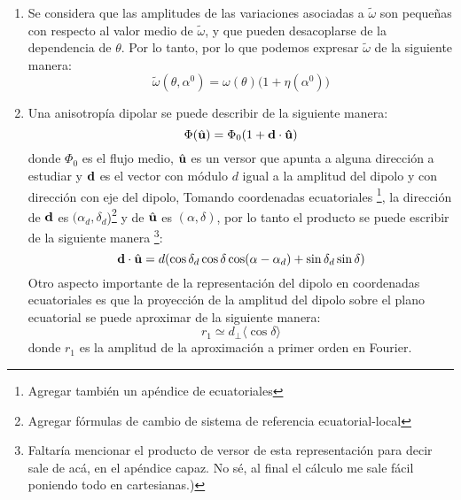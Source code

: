 \begin{enumerate}
    \item Se considera que las amplitudes de las variaciones asociadas a $\tilde{\omega}$ son pequeñas con respecto al valor medio de $\tilde{\omega}$, y que pueden  desacoplarse de la dependencia de $\theta$. Por lo tanto, por lo que podemos expresar $\tilde{\omega}$ de la siguiente manera:
    \begin{equation}
        \tilde{\omega}(\theta, \alpha^0) = \omega(\theta)\big(1 + \eta(\alpha^0) \big)
        \label{eq:omega_expandido}
    \end{equation}

    \item Una anisotropía dipolar se puede describir de la siguiente manera:
    \begin{equation}
        \Phi(\hat{\bf{u}}) = \Phi_0(1+\bf{d}\cdot\hat{\bf{u}})
        \label{eq:dipolo_general}
    \end{equation}
    \noindent donde $\Phi_0$ es el flujo medio, $\hat{\bf{u}}$ es un versor que apunta a alguna dirección a estudiar y $\bf{d}$ es el vector con módulo $d$ igual a la amplitud del dipolo y  con dirección  con eje del dipolo, Tomando coordenadas ecuatoriales \footnote{Agregar también un apéndice de ecuatoriales}, la dirección de $\bf{d}$ es $(\alpha_d, \delta_d$)\footnote{Agregar fórmulas de cambio de sistema de referencia ecuatorial-local} y  de $\hat{\bf{u}}$ es $(\alpha, \delta)$, por lo tanto  el producto se puede escribir de la siguiente manera \footnote{Faltaría mencionar el producto de versor de esta representación para decir sale de acá, en el apéndice capaz. No sé, al final el cálculo me  sale fácil poniendo  todo en cartesianas.)}:
    \begin{equation*}
        \textbf{d}\cdot\hat{\bf{u}}= d (\cos\delta_d \cos\delta \cos(\alpha - \alpha_d) + \sin\delta_d  \sin\delta)
        \label{eq:product_ud}
    \end{equation*}
    Otro aspecto importante de la representación del dipolo en coordenadas ecuatoriales es que la proyección de la amplitud del dipolo sobre el plano ecuatorial se puede aproximar de la siguiente manera:
    \begin{equation}
        r_1 \simeq d_\perp \langle \cos\delta \rangle
        \label{eq:fourier_perp}
    \end{equation}
    donde $r_1$ es la amplitud de la aproximación a primer orden en Fourier.

    

\end{enumerate}
